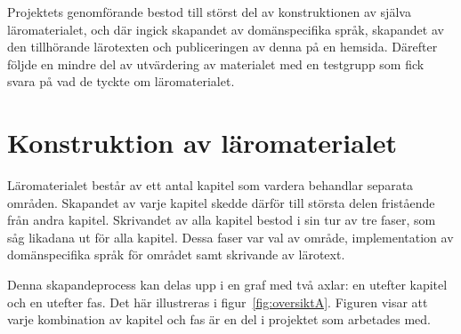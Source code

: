 \begin{draft}

Projektets genomförande bestod till störst del av konstruktionen av själva
läromaterialet, och där ingick skapandet av domänspecifika språk, skapandet av
den tillhörande lärotexten och publiceringen av denna på en hemsida. Därefter
följde en mindre del av utvärdering av materialet med en testgrupp som fick
svara på vad de tyckte om läromaterialet.

\section{Konstruktion av läromaterialet}

Läromaterialet består av ett antal kapitel som vardera behandlar separata
områden. Skapandet av varje kapitel skedde därför till största delen fristående
från andra kapitel. Skrivandet av alla kapitel bestod i sin tur av tre faser,
som såg likadana ut för alla kapitel. Dessa faser var val av område,
implementation av domänspecifika språk för området samt skrivande av lärotext.

Denna skapandeprocess kan delas upp i en graf med två axlar: en utefter kapitel och en
utefter fas. Det här illustreras i figur~\ref{fig:oversiktA}. Figuren visar att
varje kombination av kapitel och fas är en del i projektet som arbetades med.


\end{draft}
